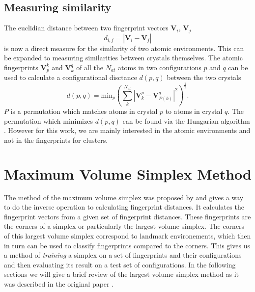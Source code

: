 \subsection{Measuring similarity}
The euclidian distance between two fingerprint vectors $\mathbf{V}_i$, $\mathbf{V}_j$ 
\begin{equation}\label{fp_dist}
d_{i,j}=|\mathbf{V}_i-\mathbf{V}_j|
\end{equation}
is now a direct measure for the similarity of two atomic environments. This can be expanded to measuring similarities between crystals themselves. The atomic fingerprints $\mathbf{V}_p^k$ and $\mathbf{V}_k^q$ of all the $N_{at}$ atoms in two configurations $p$ and $q$ can be used to calculate a configurational disctance $d(p,q)$ between the two crystals \cite{Zhu2016}
\begin{equation}d(p,q)=\text{min}_p\left(\sum_k^{N_{at}}|\mathbf{V}^p_k-\mathbf{V}^q_{P(k)}|^2\right)^{\frac{1}{2}}.\end{equation}
$P$ is a permutation which matches atoms in crystal $p$ to atoms in crystal $q$. The permutation which minimizes $d(p,q)$ can be found via the Hungarian algorithm \cite{Kuhn1955}. However for this work, we are mainly interested in the atomic environments and not in the fingerprints for clusters.

\section{Maximum Volume Simplex Method}
The method of the maximum volume simplex was proposed by \citeauthor{Behnam2020} \cite{Behnam2020} and gives a way to do the inverse operation to calculating fingerprint distances. It calculates the fingerprint vectors from a given set of fingerprint distances. These fingerprints are the corners of a simplex or particularly the largest volume simplex. The corners of this largest volume simplex correspond to landmark environements, which then in turn can be used to classify fingerprints compared to the corners. This gives us a method of \emph{training} a simplex on a set of fingerprints and their configurations and then evaluating its result on a test set of configurations. In the following sections we will give a brief review of the largest volume simplex method as it was described in the original paper \cite{Behnam2020}.
